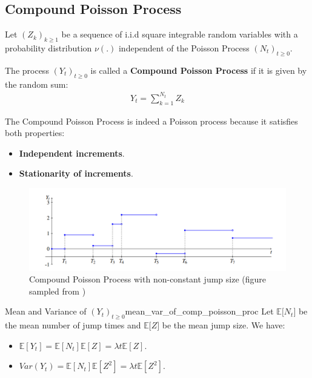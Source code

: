 \subsection{Compound Poisson Process}
\begin{definition}
    Let $(Z_k)_{k\ge1}$ be a sequence of i.i.d square integrable random variables with a probability distribution $\nu(.)$ independent of the Poisson Process $(N_t)_{t\ge0}$.

    \noindent\newline The process $(Y_t)_{t\ge0}$ is called a \textbf{Compound Poisson Process} if it is given by the random sum:
    \begin{align*}
        Y_t = \sum_{k=1}^{N_t}Z_k
    \end{align*}

    \noindent The Compound Poisson Process is indeed a Poisson process because it satisfies both properties:
    \begin{itemize}
        \item \textbf{Independent increments}.
        \item \textbf{Stationarity of increments}.
    \end{itemize}
\end{definition}

\begin{figure}[ht]
    \centering
    \includegraphics[width=\textwidth]{figures/sample_compound_poisson_process.png}
    \caption{Compound Poisson Process with non-constant jump size (figure sampled from \cite{book:privault})}
    \label{fig:sample-compound-poisson-process}
\end{figure}

\begin{proposition}{Mean and Variance of $(Y_t)_{t\ge0}$}{mean_var_of_comp_poisson_proc}
    Let $\mathbb{E}\Big[ N_t \Big]$ be the mean number of jump times and $\mathbb{E}\Big[Z\Big]$ be the mean jump size. We have:
    \begin{itemize}
        \item $\mathbb{E}[Y_t] = \mathbb{E}[N_t]\mathbb{E}[Z] = \lambda t\mathbb{E}[Z]$.
        \item $Var(Y_t) = \mathbb{E}[N_t] \mathbb{E}[Z^2] = \lambda t \mathbb{E}[Z^2]$.
    \end{itemize}
\end{proposition}

